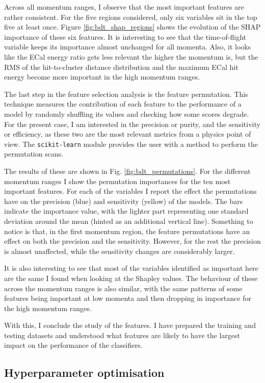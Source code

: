 Across all momentum ranges, I observe that the most important features are rather consistent. For the five regions considered, only six variables sit in the top five at least once. Figure \ref{fig:bdt_shap_regions} shows the evolution of the SHAP importance of these six features. It is interesting to see that the time-of-flight variable keeps its importance almost unchanged for all momenta. Also, it looks like the ECal energy ratio gets less relevant the higher the momentum is, but the RMS of the hit-to-cluster distance distribution and the maximum ECal hit energy become more important in the high momentum ranges.

The last step in the feature selection analysis is the feature permutation. This technique measures the contribution of each feature to the performance of a model by randomly shuffling its values and checking how some scores degrade. For the present case, I am interested in the precision or purity, and the sensitivity or efficiency, as these two are the most relevant metrics from a physics point of view. The \texttt{scikit-learn} module provides the user with a method to perform the permutation scans.

The results of these are shown in Fig. \ref{fig:bdt_permutations}. For the different momentum ranges I show the permutation importances for the ten most important features. For each of the variables I report the effect the permutations have on the precision (blue) and sensitivity (yellow) of the models. The bars indicate the importance value, with the lighter part representing one standard deviation around the mean (hinted as an additional vertical line). Something to notice is that, in the first momentum region, the feature permutations have an effect on both the precision and the sensitivity. However, for the rest the precision is almost unaffected, while the sensitivity changes are considerably larger.

It is also interesting to see that most of the variables identified as important here are the same I found when looking at the Shapley values. The behaviour of these across the momentum ranges is also similar, with the same patterns of some features being important at low momenta and then dropping in importance for the high momentum ranges.

With this, I conclude the study of the features. I have prepared the training and testing datasets and understood what features are likely to have the largest impact on the performance of the classifiers.

\subsection{Hyperparameter optimisation}

